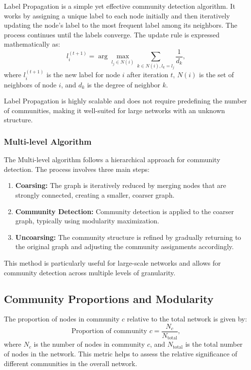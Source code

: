 \documentclass[11pt]{article}
\begin{document}
Label Propagation is a simple yet effective community detection algorithm. It works by assigning a unique label to each node initially and then iteratively updating the node's label to the most frequent label among its neighbors. The process continues until the labels converge. The update rule is expressed mathematically as:
\[
l_i^{(t+1)} = \arg\max_{l_j \in N(i)} \sum_{k \in N(i), l_k = l_j} \frac{1}{d_k},
\]
where \( l_i^{(t+1)} \) is the new label for node \( i \) after iteration \( t \), \( N(i) \) is the set of neighbors of node \( i \), and \( d_k \) is the degree of neighbor \( k \).

Label Propagation is highly scalable and does not require predefining the number of communities, making it well-suited for large networks with an unknown structure.

\subsubsection{Multi-level Algorithm}

The Multi-level algorithm follows a hierarchical approach for community detection. The process involves three main steps:

\begin{enumerate}
    \item \textbf{Coarsing:} The graph is iteratively reduced by merging nodes that are strongly connected, creating a smaller, coarser graph.
    \item \textbf{Community Detection:} Community detection is applied to the coarser graph, typically using modularity maximization.
    \item \textbf{Uncoarsing:} The community structure is refined by gradually returning to the original graph and adjusting the community assignments accordingly.
\end{enumerate}

This method is particularly useful for large-scale networks and allows for community detection across multiple levels of granularity.

\subsection{Community Proportions and Modularity}

The proportion of nodes in community \( c \) relative to the total network is given by:
\[
\text{Proportion of community } c = \frac{N_c}{N_{\text{total}}},
\]
where \( N_c \) is the number of nodes in community \( c \), and \( N_{\text{total}} \) is the total number of nodes in the network. This metric helps to assess the relative significance of different communities in the overall network.
\end{document}
